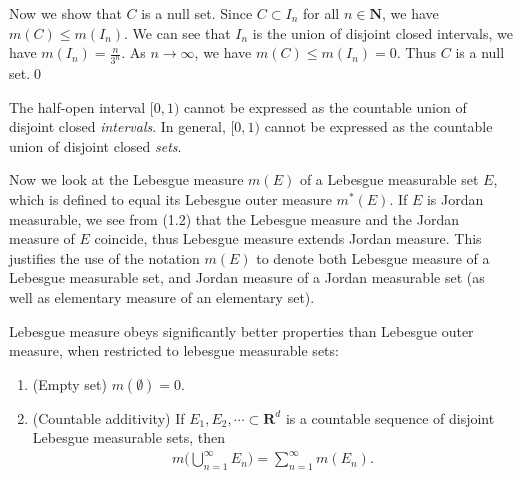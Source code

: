 \documentclass{book}
\theoremstyle{defstyle}
\theoremstyle{thmstyle}
\newcommand{\pff}{\noindent\emph{Proof.}~~}
\newcommand{\newa}{\vspace{1em}\indent}
\begin{document}
Now we show that $C$ is a null set. Since $C \subset I_n$ for all $n \in \mathbf{N}$, we have $m(C) \leq m(I_n)$. We can see that $I_n$ is the union of disjoint closed intervals, we have $m(I_n) = \frac{n}{3^n}$. As $n \to \infty$, we have $m(C) \leq m(I_n) = 0$. Thus $C$ is a null set.\qed

\begin{example}
    The half-open interval $[0, 1)$ cannot be expressed as the countable union of disjoint closed \emph{intervals}. In general, $[0, 1)$ cannot be expressed as the countable union of disjoint closed \emph{sets}.
\end{example}

\begin{comment}
\pff We can see that $[0, 1)$ cannot be expressed as the finite union of disjoint closed intervals for that which is still closed interval.

Now we consider the countable family of disjoint closed intervals $I_n = [a_n, b_n]$. Suppose for sake of contradiction that $[0, 1) = \bigcup_{n = 1}^{\infty}[a_n, b_n]$. Consider the set
    \begin{align*}
        E := \bigcup_{n = 1}^{\infty}\{a_n, b_n\}
    \end{align*}
consisting of the endpoints of intervals $I_n$. Clearly, $E$ is countable, and we have
    \begin{align*}
        E = [0, 1) \setminus \bigcup_{n = 1}^{\infty}(a_n, b_n).
    \end{align*}
\end{comment}

\newa Now we look at the Lebesgue measure $m(E)$ of a Lebesgue measurable set $E$, which is defined to equal its Lebesgue outer measure $m^*(E)$. If $E$ is Jordan measurable, we see from (1.2) that the Lebesgue measure and the Jordan measure of $E$ coincide, thus Lebesgue measure extends Jordan measure. This justifies the use of the notation $m(E)$ to denote both Lebesgue measure of a Lebesgue measurable set, and Jordan measure of a Jordan measurable set (as well as elementary measure of an elementary set).

Lebesgue measure obeys significantly better properties than Lebesgue outer measure, when restricted to lebesgue measurable sets:

\begin{lemma}\label{thm:the measure axioms}
    \quad
    \begin{enumerate}
        \item (Empty set) $m(\emptyset) = 0$.
        \item (Countable additivity) If $E_1, E_2, \cdots \subset \mathbf{R}^d$ is a countable sequence of disjoint Lebesgue measurable sets, then
            \begin{align*}
                m\Big(\bigcup_{n = 1}^{\infty}E_n\Big) = \sum_{n = 1}^{\infty}m(E_n).
            \end{align*}
    \end{enumerate}
\end{lemma}
\end{document}

